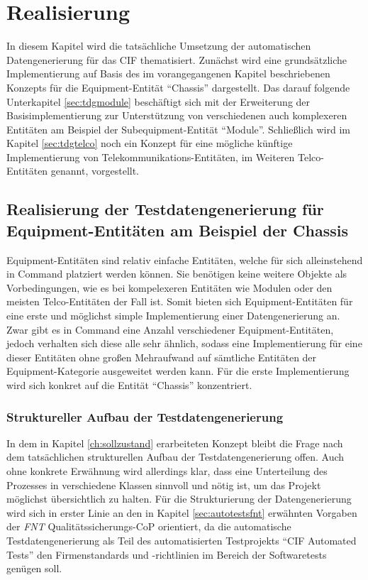 \chapter{Realisierung}\label{ch:realisierung}
In diesem Kapitel wird die tatsächliche Umsetzung der automatischen Datengenerierung für das \ac{CIF} thematisiert. Zunächst wird eine grundsätzliche Implementierung auf Basis des im vorangegangenen Kapitel beschriebenen Konzepts für die Equipment-Entität \enquote{Chassis} dargestellt. Das darauf folgende Unterkapitel \ref{sec:tdgmodule} beschäftigt sich mit der Erweiterung der Basisimplementierung zur Unterstützung von verschiedenen auch komplexeren Entitäten am Beispiel der Subequipment-Entität \enquote{Module}. Schließlich wird im Kapitel \ref{sec:tdgtelco} noch ein Konzept für eine mögliche künftige Implementierung von Telekommunikations-Entitäten, im Weiteren Telco-Entitäten genannt, vorgestellt.

\section{Realisierung der Testdatengenerierung für Equipment-Entitäten am Beispiel der Chassis}\label{sec:tdgchassis}
Equipment-Entitäten sind relativ einfache Entitäten, welche für sich alleinstehend in Command platziert werden können. Sie benötigen keine weitere Objekte als Vorbedingungen, wie es bei kompelexeren Entitäten wie Modulen oder den meisten Telco-Entitäten der Fall ist. Somit bieten sich Equipment-Entitäten für eine erste und möglichst simple Implementierung einer Datengenerierung an. Zwar gibt es in Command eine Anzahl verschiedener Equipment-Entitäten, jedoch verhalten sich diese alle sehr ähnlich, sodass eine Implementierung für eine dieser Entitäten ohne großen Mehraufwand auf sämtliche Entitäten der Equipment-Kategorie ausgeweitet werden kann. Für die erste Implementierung wird sich konkret auf die Entität \enquote{Chassis} konzentriert.

\subsection{Struktureller Aufbau der Testdatengenerierung}\label{subsec:tdgStruktur}
In dem in Kapitel \ref{ch:sollzustand} erarbeiteten Konzept bleibt die Frage nach dem tatsächlichen strukturellen Aufbau der Testdatengenerierung offen. Auch ohne konkrete Erwähnung wird allerdings klar, dass eine Unterteilung des Prozesses in verschiedene Klassen sinnvoll und nötig ist, um das Projekt möglichst übersichtlich zu halten. Für die Strukturierung der Datengenerierung wird sich in erster Linie an den in Kapitel \ref{sec:autotestsfnt} erwähnten Vorgaben der \textit{FNT} Qualitätssicherungs-\ac{CoP} orientiert, da die automatische Testdatengenerierung als Teil des automatisierten Testprojekts \enquote{CIF Automated Tests} den Firmenstandards und -richtlinien im Bereich der Softwaretests genügen soll.


